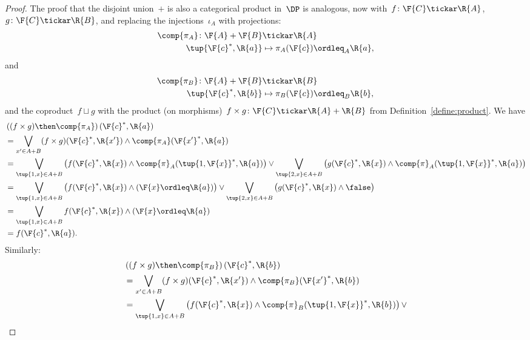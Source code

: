\begin{proof}
The proof that the disjoint union~$+$ is also a categorical product in~$\DP$ is analogous, now with~$f \colon \F{C} \tickar \R{A}$,~$g \colon \F{C} \tickar \R{B}$, and replacing the injections~$\iota_A$ with projections:
\begin{equation}
    \begin{aligned}
    \comp{\pi_A} \colon \F{A}+\F{B} &\tickar \R{A}\\
    \tup{\F{c}^*,\R{a}}&\mapsto \pi_A(\F{c})\ordleq_A \R{a},
    \end{aligned}
\end{equation}
and
\begin{equation}
    \begin{aligned}
    \comp{\pi_B} \colon \F{A}+\F{B} &\tickar \R{B}\\
    \tup{\F{c}^*,\R{b}}&\mapsto \pi_B(\F{c})\ordleq_B \R{b},
    \end{aligned}
\end{equation}
and the coproduct~$f \sqcup g$ with the product (on morphisms)~$f \times g \colon \F{C} \tickar \R{A} + \R{B}$ from Definition~\ref{define:product}. We have
\begin{equation}
    \begin{aligned}
    &\left((f\times g)\then \comp{\pi_A}\right)(\F{c}^*,\R{a})\\
    &=\bigvee_{x'\in A+B} (f\times g)(\F{c}^*,\R{x'}) \wedge \comp{\pi_A}(\F{x'}^*,\R{a})\\
    &=\bigvee_{\tup{1,x}\in A+B}\left( f(\F{c}^*,\R{x}) \wedge \comp{\pi}_A(\tup{1,\F{x}}^*,\R{a})\right) \vee 
    \bigvee_{\tup{2,x}\in A+B}\left( g(\F{c}^*,\R{x}) \wedge \comp{\pi}_A(\tup{1,\F{x}}^*,\R{a})\right)\\
    &=\bigvee_{\tup{1,x}\in A+B}\left( f(\F{c}^*,\R{x}) \wedge (\F{x}\ordleq \R{a})\right) \vee 
    \bigvee_{\tup{2,x}\in A+B}\left( g(\F{c}^*,\R{x}) \wedge \false \right)\\
    &=\bigvee_{\tup{1,x}\in A+B} f(\F{c}^*,\R{x}) \wedge (\F{x}\ordleq \R{a})\\
    &=f(\F{c}^*,\R{a}).
    \end{aligned}
\end{equation}
Similarly:
\begin{equation}
    \begin{aligned}
    &\left((f\times g)\then \comp{\pi_B}\right)(\F{c}^*,\R{b})\\
    &=\bigvee_{x'\in A+B} (f\times g)(\F{c}^*,\R{x'}) \wedge \comp{\pi_B}(\F{x'}^*,\R{b})\\
    &=\bigvee_{\tup{1,x}\in A+B}\left( f(\F{c}^*,\R{x}) \wedge \comp{\pi}_B(\tup{1,\F{x}}^*,\R{b})\right) \vee 

\end{aligned}
\end{equation}
\end{proof}
